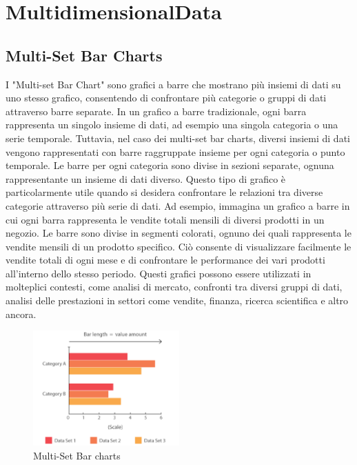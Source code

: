 \section{MultidimensionalData}
\subsection{Multi-Set Bar Charts}
I "Multi-set Bar Chart" sono grafici a barre che mostrano più insiemi di dati su uno stesso grafico, consentendo di confrontare più categorie o gruppi di dati attraverso barre separate.
In un grafico a barre tradizionale, ogni barra rappresenta un singolo insieme di dati, ad esempio una singola categoria o una serie temporale. Tuttavia, nel caso dei multi-set bar charts, diversi insiemi di dati vengono rappresentati con barre raggruppate insieme per ogni categoria o punto temporale.
Le barre per ogni categoria sono divise in sezioni separate, ognuna rappresentante un insieme di dati diverso. Questo tipo di grafico è particolarmente utile quando si desidera confrontare le relazioni tra diverse categorie attraverso più serie di dati.
Ad esempio, immagina un grafico a barre in cui ogni barra rappresenta le vendite totali mensili di diversi prodotti in un negozio. Le barre sono divise in segmenti colorati, ognuno dei quali rappresenta le vendite mensili di un prodotto specifico. Ciò consente di visualizzare facilmente le vendite totali di ogni mese e di confrontare le performance dei vari prodotti all'interno dello stesso periodo.
Questi grafici possono essere utilizzati in molteplici contesti, come analisi di mercato, confronti tra diversi gruppi di dati, analisi delle prestazioni in settori come vendite, finanza, ricerca scientifica e altro ancora.
\begin{figure}[H]
  \centering
  \includegraphics[width=0.5\textwidth]{images/mutiBargr.png} 
  \caption{Multi-Set Bar charts}
  \label{fig:immagine}
\end{figure}

